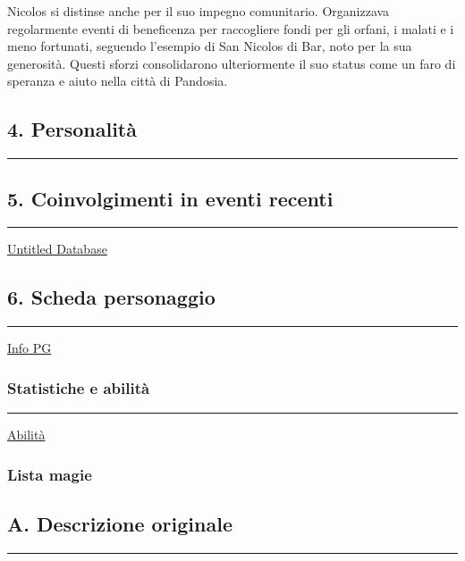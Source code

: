 Nicolos si distinse anche per il suo impegno comunitario. Organizzava
regolarmente eventi di beneficenza per raccogliere fondi per gli orfani,
i malati e i meno fortunati, seguendo l'esempio di San Nicolos di Bar,
noto per la sua generosità. Questi sforzi consolidarono ulteriormente il
suo status come un faro di speranza e aiuto nella città di Pandosia.

\subsection{4. Personalità}\label{personalituxe0}

\begin{center}\rule{0.5\linewidth}{0.5pt}\end{center}

\subsection{5. Coinvolgimenti in eventi
recenti}\label{coinvolgimenti-in-eventi-recenti}

\begin{center}\rule{0.5\linewidth}{0.5pt}\end{center}

\href{Untitled\%20Database\%206862812dd1bd4510960e013bb45ddbf8.csv}{Untitled
Database}

\subsection{6. Scheda personaggio}\label{scheda-personaggio}

\begin{center}\rule{0.5\linewidth}{0.5pt}\end{center}

\href{Info\%20PG\%204df6886f9e2044c494002856a4ea0f50.csv}{Info PG}

\subsubsection{Statistiche e abilità}\label{statistiche-e-abilituxe0}

\begin{center}\rule{0.5\linewidth}{0.5pt}\end{center}

\href{Abilita\%CC\%80\%20e49d5669224e41728d04dce2a31d4614.csv}{Abilità}

\subsubsection{Lista magie}\label{lista-magie}

\subsection{A. Descrizione originale}\label{a.-descrizione-originale}

\begin{center}\rule{0.5\linewidth}{0.5pt}\end{center}
